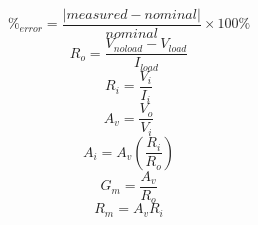 \documentclass{article}
\begin{document}
\begin{equation}
  \label{eqn:percent_error}
  \%_{error} = \frac{|measured - nominal|}{nominal} \times 100\%
\end{equation}
%
\begin{equation}
  \label{eqn:R_o}
  R_o = \frac{V_{noload} - V_{load}}{I_{load}}
\end{equation}
%
\begin{equation}
  \label{eqn:R_i}
  R_i = \frac{V_i}{I_i}
\end{equation}
%
\begin{equation}
  \label{eqn:A_v}
  A_v = \frac{V_o}{V_i}
\end{equation}
%
\begin{equation}
  \label{eqn:A_i}
  A_i = A_v \left(\frac{R_i}{R_o}\right)
\end{equation}
%
\begin{equation}
  \label{eqn:G_m}
  G_m = \frac{A_v}{R_o}
\end{equation}
%
\begin{equation}
  \label{eqn:R_m}
  R_m = A_v R_i
\end{equation}
\end{document}
